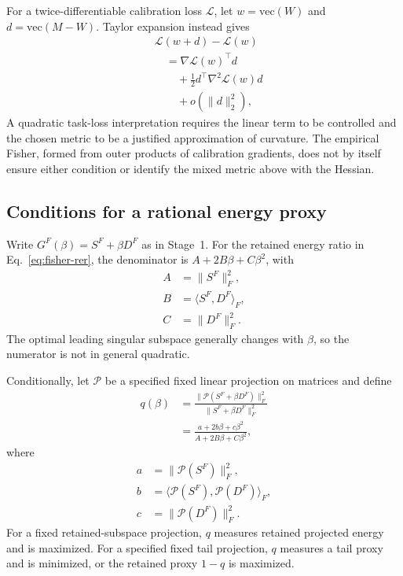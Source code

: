 For a twice-differentiable calibration loss $\mathcal L$, let $w=\mathrm{vec}(W)$ and $d=\mathrm{vec}(M-W)$. Taylor expansion instead gives
\begin{equation}
\begin{aligned}
&\mathcal L(w+d)-\mathcal L(w)\\
&\quad=\nabla\mathcal L(w)^\top d \\
&\qquad+\tfrac12 d^\top\nabla^2\mathcal L(w)d\\
&\qquad+o(\|d\|_2^2),
\end{aligned}
\end{equation}
A quadratic task-loss interpretation requires the linear term to be controlled and the chosen metric to be a justified approximation of curvature. The empirical Fisher, formed from outer products of calibration gradients, does not by itself ensure either condition or identify the mixed metric above with the Hessian.



\subsection{Conditions for a rational energy proxy}\label{sup:beta-proxy}

Write $G^F(\beta)=S^F+\beta D^F$ as in Stage~1. For the retained energy ratio in Eq.~\eqref{eq:fisher-rer}, the denominator is $A+2B\beta+C\beta^2$, with
\begin{equation}
\begin{aligned}
A&=\|S^F\|_F^2,\\
B&=\langle S^F,D^F\rangle_F,\\
C&=\|D^F\|_F^2.
\end{aligned}
\end{equation}
The optimal leading singular subspace generally changes with $\beta$, so the numerator is not in general quadratic.

Conditionally, let $\mathcal P$ be a specified fixed linear projection on matrices and define
\begin{equation}
\begin{aligned}
q(\beta)&=\frac{\|\mathcal P(S^F+\beta D^F)\|_F^2}{\|S^F+\beta D^F\|_F^2}\\
&=\frac{a+2b\beta+c\beta^2}{A+2B\beta+C\beta^2},
\end{aligned}
\end{equation}
where
\begin{equation}
\begin{aligned}
a&=\|\mathcal P(S^F)\|_F^2, \\
b&=\langle\mathcal P(S^F),\mathcal P(D^F)\rangle_F, \\
c&=\|\mathcal P(D^F)\|_F^2.
\end{aligned}
\end{equation}
For a fixed retained-subspace projection, $q$ measures retained projected energy and is maximized. For a specified fixed tail projection, $q$ measures a tail proxy and is minimized, or the retained proxy $1-q$ is maximized.

